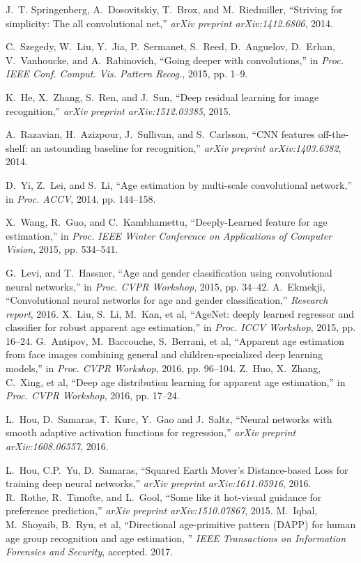 \documentclass[journal]{IEEEtran}
\begin{document}
\begin{thebibliography}{1}
J.~T. Springenberg, A.~Dosovitskiy, T.~Brox, and M.~Riedmiller, ``Striving for simplicity: The all convolutional net,'' \emph{arXiv preprint arXiv:1412.6806}, 2014. 

C.~Szegedy, W.~Liu, Y.~Jia, P.~Sermanet, S.~Reed, D.~Anguelov, D.~Erhan, V.~Vanhoucke, and A.~Rabinovich, ``Going deeper with convolutions,'' in
  \emph{Proc. IEEE Conf. Comput. Vis. Pattern Recog.}, 2015, pp. 1--9.

K.~He, X.~Zhang, S.~Ren, and J.~Sun, ``Deep residual learning for image recognition,'' \emph{arXiv preprint arXiv:1512.03385}, 2015. 

A.~Razavian, H.~Azizpour, J.~Sullivan, and S.~Carlsson, ``CNN features off-the-shelf: an astounding baseline for recognition,'' \emph{arXiv preprint arXiv:1403.6382}, 2014. 

D.~Yi, Z.~Lei, and S.~Li, ``Age estimation by multi-scale convolutional network,'' in \emph{Proc. ACCV}, 2014, pp. 144--158.

X.~Wang, R.~Guo, and C.~Kambhamettu, ``Deeply-Learned feature for age estimation,'' in \emph{Proc. IEEE Winter Conference on Applications of Computer Vision}, 2015, pp. 534--541.

G.~Levi, and T.~Hassner, ``Age and gender classification using convolutional neural networks,'' in \emph{Proc. CVPR Workshop}, 2015, pp. 34--42.
A.~Ekmekji, ``Convolutional neural networks for age and gender classification,'' \emph{Research report}, 2016.
X.~Liu, S.~Li, M.~Kan, et al, ``AgeNet: deeply learned regressor and classifier for robust apparent age estimation,'' in \emph{Proc. ICCV Workshop}, 2015, pp. 16--24.
G.~Antipov, M.~Baccouche, S.~Berrani, et al, ``Apparent age estimation from face images combining general and children-specialized deep learning models,'' in \emph{Proc. CVPR Workshop}, 2016, pp. 96--104.
Z.~Huo, X.~Zhang, C.~Xing, et al, ``Deep age distribution learning for apparent age estimation,'' in \emph{Proc. CVPR Workshop}, 2016, pp. 17--24.

L.~Hou, D.~Samaras, T.~Kurc, Y.~Gao and J.~Saltz, ``Neural networks with smooth adaptive activation functions for regression,'' \emph{arXiv preprint arXiv:1608.06557}, 2016. 

L.~Hou, C.P.~Yu, D.~Samaras, ``Squared Earth Mover's Distance-based Loss for training deep neural networks,'' \emph{arXiv preprint arXiv:1611.05916}, 2016.
R.~Rothe, R.~Timofte, and L.~Gool, ``Some like it hot-visual guidance for preference prediction,'' \emph{arXiv preprint arXiv:1510.07867}, 2015. 
M.~Iqbal, M.~Shoyaib, B.~Ryu, et al, ``Directional age-primitive pattern (DAPP) for human age group recognition and age estimation, '' \emph{IEEE Transactions on Information Forensics and Security}, accepted. 2017.


\end{thebibliography}
\end{document}
